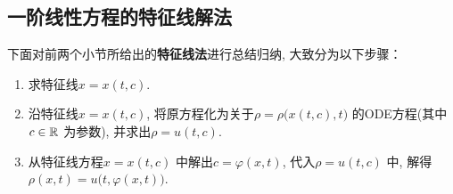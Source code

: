 \newpage

\subsection{一阶线性方程的特征线解法}
	下面对前两个小节所给出的\textbf{特征线法}进行总结归纳, 大致分为以下步骤：
	
	\vspace*{1em}
	
	\begin{enumerate}
		\item 求特征线$x = x(t , c)$. 
		
		\vspace*{1em}
		
		\item 沿特征线$x = x(t , c)$, 将原方程化为关于$\rho = \rho \Big( x(t , c) , t \Big)$ 的ODE方程(其中$c \in \mathbb{R}$ 为参数), 并求出$\rho = u(t , c)$. 
		
		\vspace*{1em}
		
		\item 从特征线方程$x = x(t , c)$ 中解出$c = \varphi(x , t)$, 代入$\rho = u(t , c)$ 中, 解得$\rho(x , t) = u \Big( t , \varphi(x , t) \Big)$.
	\end{enumerate}
	
	\vspace*{4em}
	
